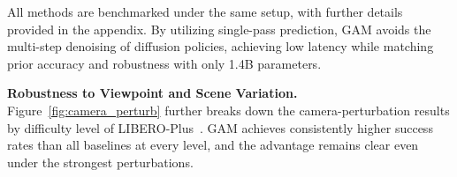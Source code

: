 All methods are benchmarked under the same setup, with further details provided in the appendix. By utilizing single-pass prediction, GAM avoids the multi-step denoising of diffusion policies, achieving low latency while matching prior accuracy and robustness with only 1.4B parameters.


\noindent\textbf{Robustness to Viewpoint and Scene Variation.} Figure~\ref{fig:camera_perturb} further breaks down the camera-perturbation results by difficulty level of LIBERO-Plus~\cite{fei2025libero}. GAM achieves consistently higher success rates than all baselines at every level, and the advantage remains clear even under the strongest perturbations.
